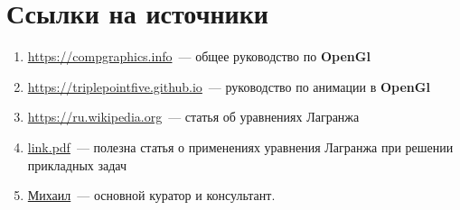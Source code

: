 \section{Ссылки на источники}
\begin{enumerate}
		\item \href{https://compgraphics.info}{https://compgraphics.info}~--- общее руководство по \textbf{OpenGl}
		\item \href{https://triplepointfive.github.io}{https://triplepointfive.github.io}~--- руководство по анимации в \textbf{OpenGl}
		\item \href{https://ru.wikipedia.org}{https://ru.wikipedia.org}~--- статья об уравнениях Лагранжа
		\item \href{https://kubsau.ru/upload/iblock/110/110d9022041a720e206f4d31d4902d82.pdf}{link.pdf}~--- полезна статья о применениях уравнения Лагранжа при решении прикладных задач
		\item \href{https://vk.com/id174320308}{Михаил}~--- основной куратор и консультант.
	\end{enumerate}